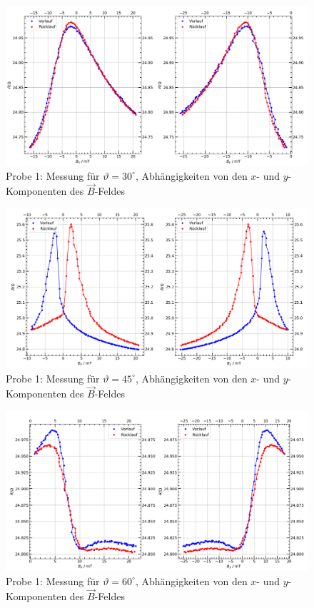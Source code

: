 \documentclass[german,  %
parskip=full,  %
]{scrartcl}
\begin{document}
\newpage
\begin{figure}[h!]\centering
\includegraphics[width=\textwidth]{Probe1_30_Grad.png}
\caption{Probe 1: Messung für \(\vartheta=30^{\circ}\), Abhängigkeiten von den \(x\)- und \(y\)-Komponenten des \(\vec{B}\)-Feldes}
\end{figure} 
\begin{figure}[h!]\centering
\includegraphics[width=\textwidth]{Probe1_45_Grad.png}
\caption{Probe 1: Messung für \(\vartheta=45^{\circ}\), Abhängigkeiten von den \(x\)- und \(y\)-Komponenten des \(\vec{B}\)-Feldes}
\end{figure} 
\newpage
\begin{figure}[h!]\centering
\includegraphics[width=\textwidth]{Probe1_60_Grad.png}
\caption{Probe 1: Messung für \(\vartheta=60^{\circ}\), Abhängigkeiten von den \(x\)- und \(y\)-Komponenten des \(\vec{B}\)-Feldes}
\end{figure} 
\end{document}
